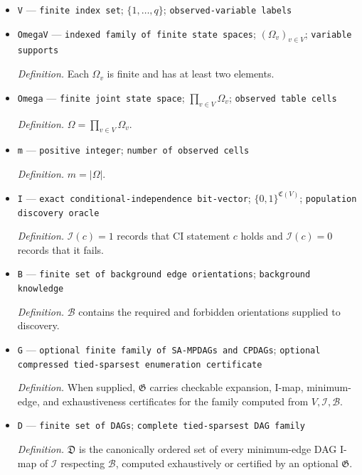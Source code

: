 \documentclass{article}
\begin{document}
\begin{itemize}
  \item \texttt{V} --- \texttt{finite index set}; \(\{1,\ldots,q\}\); \texttt{observed-\allowbreak{}variable labels}
  \item \texttt{OmegaV} --- \texttt{indexed family of finite state spaces}; \((\Omega_v)_{v\in V}\); \texttt{variable supports}
  \par\smallskip\noindent\emph{Definition.} Each \(\Omega_v\) is finite and has at least two elements.
  \item \texttt{Omega} --- \texttt{finite joint state space}; \(\prod_{v\in V}\Omega_v\); \texttt{observed table cells}
  \par\smallskip\noindent\emph{Definition.} \(\Omega=\prod_{v\in V}\Omega_v\).
  \item \texttt{m} --- \texttt{positive integer}; \texttt{number of observed cells}
  \par\smallskip\noindent\emph{Definition.} \(m=|\Omega|\).
  \item \texttt{I} --- \texttt{exact conditional-\allowbreak{}independence bit-\allowbreak{}vector}; \(\{0,1\}^{\mathfrak C(V)}\); \texttt{population discovery oracle}
  \par\smallskip\noindent\emph{Definition.} \(\mathcal I(c)=1\) records that CI statement \(c\) holds and \(\mathcal I(c)=0\) records that it fails.
  \item \texttt{B} --- \texttt{finite set of background edge orientations}; \texttt{background knowledge}
  \par\smallskip\noindent\emph{Definition.} \(\mathcal B\) contains the required and forbidden orientations supplied to discovery.
  \item \texttt{G} --- \texttt{optional finite family of SA-\allowbreak{}MPDAGs and CPDAGs}; \texttt{optional compressed tied-\allowbreak{}sparsest enumeration certificate}
  \par\smallskip\noindent\emph{Definition.} When supplied, \(\mathfrak G\) carries checkable expansion, I-map, minimum-edge, and exhaustiveness certificates for the family computed from \(V,\mathcal I,\mathcal B\).
  \item \texttt{D} --- \texttt{finite set of DAGs}; \texttt{complete tied-\allowbreak{}sparsest DAG family}
  \par\smallskip\noindent\emph{Definition.} \(\mathfrak D\) is the canonically ordered set of every minimum-edge DAG I-map of \(\mathcal I\) respecting \(\mathcal B\), computed exhaustively or certified by an optional \(\mathfrak G\).

\end{itemize}
\end{document}
